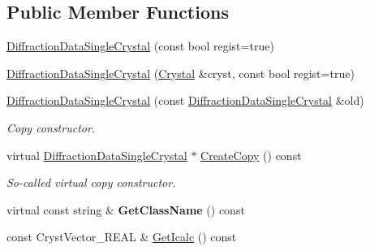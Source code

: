 \subsection*{Public Member Functions}
\begin{DoxyCompactItemize}
\item 
\mbox{\hyperlink{class_obj_cryst_1_1_diffraction_data_single_crystal_ab182bcffdd5cded6e7bd536bc71a3241}{Diffraction\+Data\+Single\+Crystal}} (const bool regist=true)
\item 
\mbox{\hyperlink{class_obj_cryst_1_1_diffraction_data_single_crystal_a3fcfa9d8f263043025d4167001c2243f}{Diffraction\+Data\+Single\+Crystal}} (\mbox{\hyperlink{class_obj_cryst_1_1_crystal}{Crystal}} \&cryst, const bool regist=true)
\item 
\mbox{\label{class_obj_cryst_1_1_diffraction_data_single_crystal_a2fbe3262e7146a0c1057da102d0a9046}} 
\mbox{\hyperlink{class_obj_cryst_1_1_diffraction_data_single_crystal_a2fbe3262e7146a0c1057da102d0a9046}{Diffraction\+Data\+Single\+Crystal}} (const \mbox{\hyperlink{class_obj_cryst_1_1_diffraction_data_single_crystal}{Diffraction\+Data\+Single\+Crystal}} \&old)
\begin{DoxyCompactList}\small\item\em Copy constructor. \end{DoxyCompactList}\item 
\mbox{\label{class_obj_cryst_1_1_diffraction_data_single_crystal_a9d1a6d1503ae27642e2d12a9fa9e1062}} 
virtual \mbox{\hyperlink{class_obj_cryst_1_1_diffraction_data_single_crystal}{Diffraction\+Data\+Single\+Crystal}} $\ast$ \mbox{\hyperlink{class_obj_cryst_1_1_diffraction_data_single_crystal_a9d1a6d1503ae27642e2d12a9fa9e1062}{Create\+Copy}} () const
\begin{DoxyCompactList}\small\item\em So-\/called virtual copy constructor. \end{DoxyCompactList}\item 
\mbox{\label{class_obj_cryst_1_1_diffraction_data_single_crystal_a9c0c8fc1d91f6c6df1811af935644d6c}} 
virtual const string \& {\bfseries Get\+Class\+Name} () const
\item 
const Cryst\+Vector\+\_\+\+R\+E\+AL \& \mbox{\hyperlink{class_obj_cryst_1_1_diffraction_data_single_crystal_ae6bc594be6f3e198572516bbe739d851}{Get\+Icalc}} () const

\end{DoxyCompactItemize}
